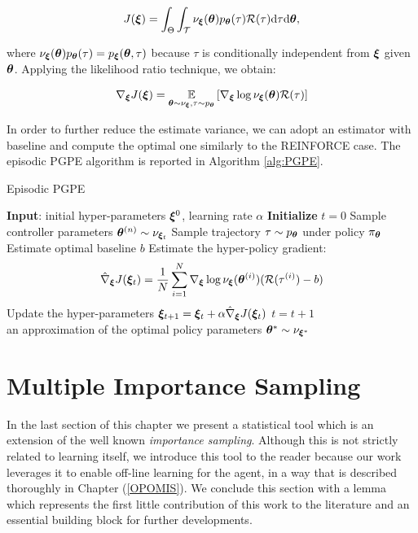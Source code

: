 \begin{align}
J(\boldsymbol{\xi}) = \int_{\Theta}\int_{\mathcal{T}}\nu_{\boldsymbol{\xi}}(\boldsymbol{\theta})p_{\boldsymbol{\theta}}(\tau)\mathcal{R}(\tau)\mathrm{d}\tau \mathrm{d}\boldsymbol{\theta}, 
\end{align}

where $\nu_{\boldsymbol{\xi}}(\boldsymbol{\theta})p_{\boldsymbol{\theta}}(\tau)=p_{\boldsymbol{\xi}}(\boldsymbol{\theta},\tau)$ because $\tau$ is conditionally independent from $\boldsymbol{\xi}$ given $\boldsymbol{\theta}$. Applying the likelihood ratio technique, we obtain:

\begin{align}
\nabla_{\boldsymbol{\xi}}J(\boldsymbol{\xi}) = \underset{\boldsymbol{\theta}\sim\nu_{\boldsymbol{\xi}}, \tau\sim p_{\boldsymbol{\theta}}}{\mathbb{E}}\left[{\nabla_{\boldsymbol{\xi}}\log\nu_{\boldsymbol{\xi}}(\boldsymbol{\theta})\mathcal{R}(\tau)}\right] 
\end{align}

In order to further reduce the estimate variance, we can adopt an estimator with baseline and compute the optimal one similarly to the REINFORCE case. The episodic \gls{PGPE} algorithm is reported in Algorithm \ref{alg:PGPE}.

\begin{algorithm}[t]
	\caption{Episodic \gls{PGPE}}
	\label{alg:PGPE}
	\begin{algorithmic}[1]
	\State \textbf{Input}: initial hyper-parameters $\boldsymbol{\xi}^{0}$, learning rate $\alpha$
	\State \textbf{Initialize} $t=0$
			\State Sample controller parameters $\boldsymbol{\theta}^{(n)} \sim\nu_{\boldsymbol{\xi}_t}$
			\State Sample trajectory $\tau\sim p_{\boldsymbol{\theta}}$ under policy $\pi_{\boldsymbol{\theta}}$
		\EndFor 
		\State Estimate optimal baseline $b$
		\State Estimate the hyper-policy gradient:
		\begin{align*}
		\hat{\nabla}_{\boldsymbol{\xi}}J(\boldsymbol{\xi}_t) = \frac{1}{N}\sum_{i=1}^{N}\nabla_{\boldsymbol{\xi}}\log \nu_{\boldsymbol{\xi}}(\boldsymbol{\theta}^{(i)})(\mathcal{R}(\tau^{(i)}) - b)
		\end{align*}
		\State Update the hyper-parameters $\boldsymbol{\xi}_{t+1} = \boldsymbol{\xi}_{t}+\alpha\hat{\nabla}_{\boldsymbol{\xi}}J(\boldsymbol{\xi}_t)$
		\State $t = t + 1$
	\EndWhile \\
	\Return an approximation of the optimal policy parameters $\boldsymbol{\theta}^* \sim \nu_{\boldsymbol{\xi}^*}$
	\end{algorithmic}
\end{algorithm}

\section{Multiple Importance Sampling} \label{sec:mis}
In the last section of this chapter we present a statistical tool which is an extension of the well known \emph{importance sampling}. Although this is not strictly related to learning itself, we introduce this tool to the reader because our work leverages it to enable off-line learning for the agent, in a way that is described thoroughly in Chapter (\ref{OPOMIS}).
We conclude this section with a lemma which represents the first little contribution of this work to the literature and an essential building block for further developments.

